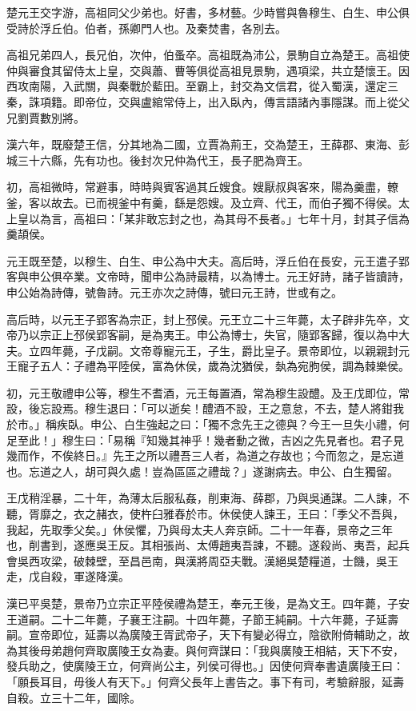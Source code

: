 
\begin{pinyinscope}
楚元王交字游，高祖同父少弟也。好書，多材藝。少時嘗與魯穆生、白生、申公俱受詩於浮丘伯。伯者，孫卿門人也。及秦焚書，各別去。

高祖兄弟四人，長兄伯，次仲，伯蚤卒。高祖既為沛公，景駒自立為楚王。高祖使仲與審食其留侍太上皇，交與蕭、曹等俱從高祖見景駒，遇項梁，共立楚懷王。因西攻南陽，入武關，與秦戰於藍田。至霸上，封交為文信君，從入蜀漢，還定三秦，誅項籍。即帝位，交與盧綰常侍上，出入臥內，傳言語諸內事隱謀。而上從父兄劉賈數別將。

漢六年，既廢楚王信，分其地為二國，立賈為荊王，交為楚王，王薛郡、東海、彭城三十六縣，先有功也。後封次兄仲為代王，長子肥為齊王。

初，高祖微時，常避事，時時與賓客過其丘嫂食。嫂厭叔與客來，陽為羹盡，轑釜，客以故去。已而視釜中有羹，繇是怨嫂。及立齊、代王，而伯子獨不得侯。太上皇以為言，高祖曰：「某非敢忘封之也，為其母不長者。」七年十月，封其子信為羹頡侯。

元王既至楚，以穆生、白生、申公為中大夫。高后時，浮丘伯在長安，元王遣子郢客與申公俱卒業。文帝時，聞申公為詩最精，以為博士。元王好詩，諸子皆讀詩，申公始為詩傳，號魯詩。元王亦次之詩傳，號曰元王詩，世或有之。

高后時，以元王子郢客為宗正，封上邳侯。元王立二十三年薨，太子辟非先卒，文帝乃以宗正上邳侯郢客嗣，是為夷王。申公為博士，失官，隨郢客歸，復以為中大夫。立四年薨，子戊嗣。文帝尊寵元王，子生，爵比皇子。景帝即位，以親親封元王寵子五人：子禮為平陸侯，富為休侯，歲為沈猶侯，埶為宛朐侯，調為棘樂侯。

初，元王敬禮申公等，穆生不耆酒，元王每置酒，常為穆生設醴。及王戊即位，常設，後忘設焉。穆生退曰：「可以逝矣！醴酒不設，王之意怠，不去，楚人將鉗我於市。」稱疾臥。申公、白生強起之曰：「獨不念先王之德與？今王一旦失小禮，何足至此！」穆生曰：「易稱『知幾其神乎！幾者動之微，吉凶之先見者也。君子見幾而作，不俟終日。』先王之所以禮吾三人者，為道之存故也；今而忽之，是忘道也。忘道之人，胡可與久處！豈為區區之禮哉？」遂謝病去。申公、白生獨留。

王戊稍淫暴，二十年，為薄太后服私姦，削東海、薛郡，乃與吳通謀。二人諫，不聽，胥靡之，衣之赭衣，使杵臼雅舂於市。休侯使人諫王，王曰：「季父不吾與，我起，先取季父矣。」休侯懼，乃與母太夫人奔京師。二十一年春，景帝之三年也，削書到，遂應吳王反。其相張尚、太傅趙夷吾諫，不聽。遂殺尚、夷吾，起兵會吳西攻梁，破棘壁，至昌邑南，與漢將周亞夫戰。漢絕吳楚糧道，士饑，吳王走，戊自殺，軍遂降漢。

漢已平吳楚，景帝乃立宗正平陸侯禮為楚王，奉元王後，是為文王。四年薨，子安王道嗣。二十二年薨，子襄王注嗣。十四年薨，子節王純嗣。十六年薨，子延壽嗣。宣帝即位，延壽以為廣陵王胥武帝子，天下有變必得立，陰欲附倚輔助之，故為其後母弟趙何齊取廣陵王女為妻。與何齊謀曰：「我與廣陵王相結，天下不安，發兵助之，使廣陵王立，何齊尚公主，列侯可得也。」因使何齊奉書遺廣陵王曰：「願長耳目，毋後人有天下。」何齊父長年上書告之。事下有司，考驗辭服，延壽自殺。立三十二年，國除。


\end{pinyinscope}
